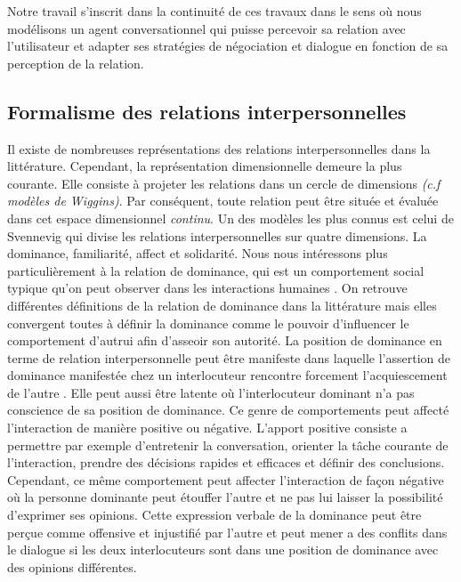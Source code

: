 \documentclass [french]{sig-alternate-05-2015}
\begin{document}
\par Notre travail s'inscrit dans la continuité de ces travaux dans le sens où nous modélisons un agent conversationnel qui puisse percevoir sa relation avec l'utilisateur et adapter ses stratégies de négociation et dialogue en fonction de sa perception de la relation. 

\subsection{Formalisme des relations interpersonnelles}
\label{RI}
 Il existe de nombreuses représentations des relations interpersonnelles dans la littérature. Cependant, la représentation dimensionnelle demeure la plus courante. Elle consiste à projeter les relations dans un cercle de dimensions \emph{(c.f modèles de Wiggins)}. Par conséquent, toute relation peut être située et évaluée dans cet espace dimensionnel \textit{continu}. Un des modèles les plus connus est celui de Svennevig \cite{svennevig2000getting} qui divise les relations interpersonnelles sur quatre dimensions. La dominance, familiarité, affect et solidarité. Nous nous intéressons plus particulièrement à la relation de dominance, qui est un comportement social typique qu'on peut observer dans les interactions humaines \cite{dunbar2005perceptions}. On retrouve différentes définitions de la relation de dominance dans la littérature mais elles convergent toutes à définir la dominance comme le pouvoir d'influencer le comportement d'autrui afin d'asseoir son autorité. La position de dominance en terme de relation interpersonnelle peut être manifeste \cite{dunbar2005perceptions} dans laquelle l'assertion de dominance manifestée chez un interlocuteur rencontre forcement  l'acquiescement de l'autre \cite{rogers1979domineeringness}. Elle peut aussi être latente \cite{komter1989hidden} où l'interlocuteur dominant n'a pas conscience de sa position de dominance. Ce genre de comportements peut affecté l'interaction de manière positive ou négative. L'apport positive consiste a permettre par exemple d'entretenir la conversation, orienter la tâche courante de l’interaction, prendre des décisions rapides et efficaces et définir des conclusions. Cependant, ce même comportement peut affecter l’interaction de façon négative où la personne dominante peut étouffer l'autre et ne pas lui laisser la possibilité d'exprimer ses opinions. Cette expression verbale de la dominance peut être perçue comme offensive et injustifié par l'autre et peut mener a des conflits dans le dialogue si les deux interlocuteurs sont dans une position de dominance avec des opinions différentes.
\end{document}
